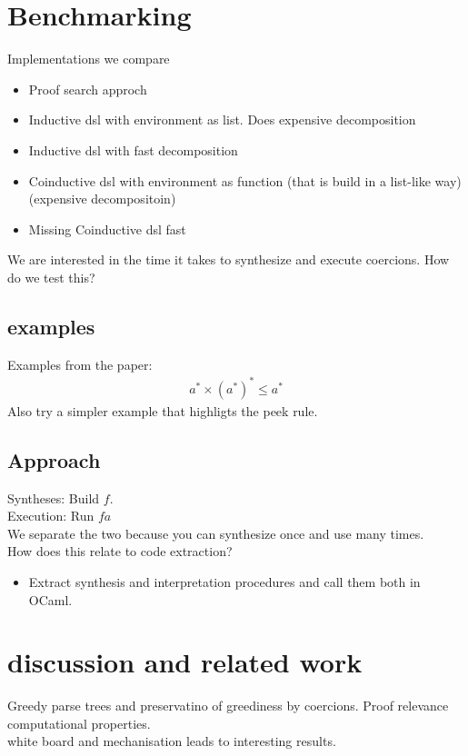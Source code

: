 \documentclass[a4paper,UKenglish,cleveref, autoref, thm-restate]{lipics-v2021}
\begin{document}
\section{Benchmarking}
Implementations we compare
\begin{itemize}
\item Proof search approch
\item Inductive dsl with environment as list. Does expensive decomposition
\item Inductive dsl with fast decomposition
\item Coinductive dsl with environment as function (that is build in a list-like way) (expensive decompositoin)
\item Missing Coinductive dsl fast
\end{itemize}

We are interested in the time it takes to synthesize and execute coercions. How do we test this?\\
\subsection{examples}
Examples from the paper:\\
\begin{align}
a ^* \times (a^*)^* \leq a^*
\end{align}
Also try a simpler example that highligts the peek rule. 
\subsection{Approach}
Syntheses: Build $f$.\\
Execution: Run $f a$\\
We separate the two because you can synthesize once and use many times.\\
How does this relate to code extraction?
\begin{itemize}
\item Extract synthesis and interpretation procedures and call them both in OCaml. 
\end{itemize}

\section{discussion and related work}
Greedy parse trees and preservatino of greediness by coercions. Proof relevance computational properties.\\
white board and mechanisation leads to interesting results.
\end{document}
